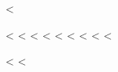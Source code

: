 <%
\setlength{\evensidemargin}{-24pt}
\setlength{\oddsidemargin}{-24pt}


\setcounter{secnumdepth}{3}    %
\setcounter{tocdepth}{2}       %

<%
<%
\ifpdftex
<%
<%
<%
<%
<%
<%
\fi
<%

<%
<%

\usepackage{calc}

\newcommand*\Descriptionlabel[1]{%
  \raisebox{0pt}[1ex][0pt]{
    \makebox[\labelwidth][1]{
      \parbox[t]{\labelwidth}{
        \hspace{0pt}\textbf{#1:}}}}
}

\newcommand*\Descriptionlabelx[1]{%
  \parbox[t]{\textwidth}{
    \textbf{#1}\\\mbox{}}
}

\newenvironment{Description}{
  \begin{list}{}{
      \let\makelabel\Descriptionlabelx
      \setlength\labelwidth{1em}
      \setlength\leftmargin{\labelwidth+\labelsep}
    }
    }
    {
  \end{list}
}

\usepackage[inline]{enumitem}


